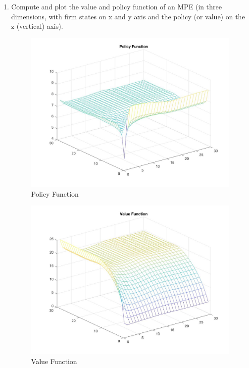 \documentclass[11pt]{article}
\begin{document}
\begin{enumerate}
\item Compute and plot the value and policy function of an MPE (in three dimensions, with firm states on x and y axis and the policy (or value) on the z (vertical) axis). \\[2em]
\begin{figure}
\centering
\includegraphics[scale=0.5]{Pol.jpg}
\caption{Policy Function}
\end{figure}

\begin{figure}
\centering
\includegraphics[scale=0.4]{val.jpg}
\caption{Value Function}
\end{figure}


\end{enumerate}
\end{document}
